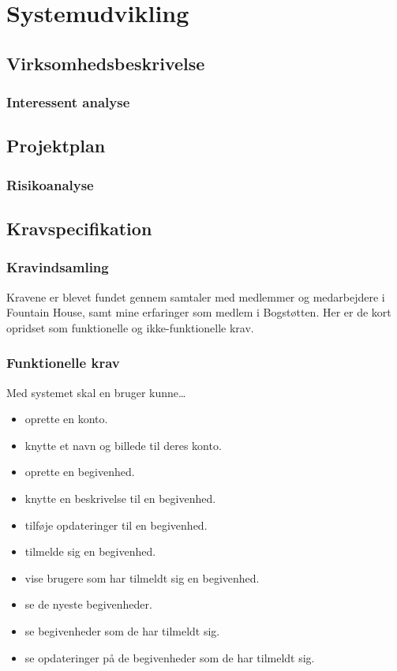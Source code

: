 \documentclass[../main]{subfiles}
\begin{document}
\chapter{Systemudvikling}


\section{Virksomhedsbeskrivelse}
\subsection{Interessent analyse}


\section{Projektplan}
    \subsection{Risikoanalyse}


\section{Kravspecifikation}
    \subsection{Kravindsamling}
        Kravene er blevet fundet gennem samtaler med medlemmer og medarbejdere i Fountain House, samt mine erfaringer som medlem i Bogstøtten. Her er de kort opridset som funktionelle og ikke-funktionelle krav.


    \subsection{Funktionelle krav}
        Med systemet skal en bruger kunne\dots
        \begin{itemize}
            \item oprette en konto.
            \item knytte et navn og billede til deres konto.
            \item oprette en begivenhed.
            \item knytte en beskrivelse til en begivenhed.
            \item tilføje opdateringer til en begivenhed.
            \item tilmelde sig en begivenhed.
            \item vise brugere som har tilmeldt sig en begivenhed.
            \item se de nyeste begivenheder.
            \item se begivenheder som de har tilmeldt sig.
            \item se opdateringer på de begivenheder som de har tilmeldt sig.
        \end{itemize}
\end{document}
